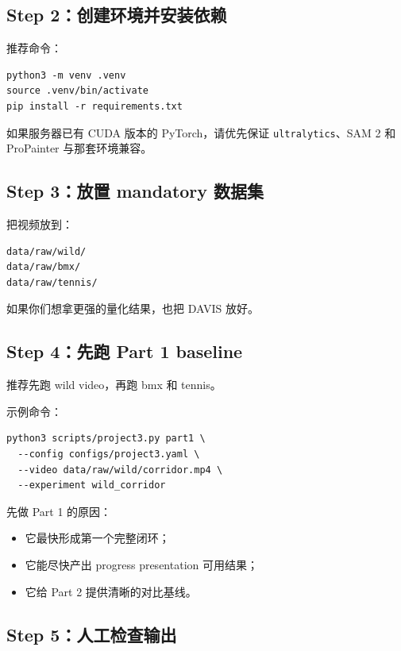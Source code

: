\documentclass[11pt,a4paper,fontset=none]{ctexart}
\begin{document}
\subsection*{Step 2：创建环境并安装依赖}

推荐命令：

\begin{Verbatim}[fontsize=\small]
python3 -m venv .venv
source .venv/bin/activate
pip install -r requirements.txt
\end{Verbatim}

如果服务器已有 CUDA 版本的 PyTorch，请优先保证 \texttt{ultralytics}、SAM 2 和 ProPainter 与那套环境兼容。

\subsection*{Step 3：放置 mandatory 数据集}

把视频放到：

\begin{Verbatim}[fontsize=\small]
data/raw/wild/
data/raw/bmx/
data/raw/tennis/
\end{Verbatim}

如果你们想拿更强的量化结果，也把 DAVIS 放好。

\subsection*{Step 4：先跑 Part 1 baseline}

推荐先跑 wild video，再跑 bmx 和 tennis。

示例命令：

\begin{Verbatim}[fontsize=\small]
python3 scripts/project3.py part1 \
  --config configs/project3.yaml \
  --video data/raw/wild/corridor.mp4 \
  --experiment wild_corridor
\end{Verbatim}

先做 Part 1 的原因：

\begin{itemize}
  \item 它最快形成第一个完整闭环；
  \item 它能尽快产出 progress presentation 可用结果；
  \item 它给 Part 2 提供清晰的对比基线。
\end{itemize}

\subsection*{Step 5：人工检查输出}
\end{document}
